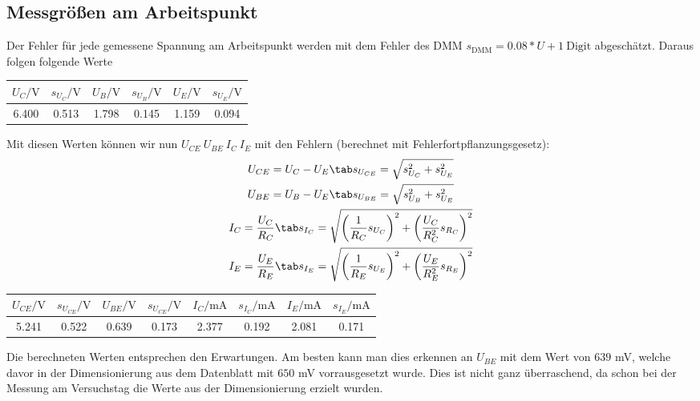 \subsection{Messgrößen am Arbeitspunkt}
Der Fehler für jede gemessene Spannung am Arbeitspunkt werden mit dem Fehler des DMM $s_{\text{DMM}} = 0.08*U + 1~\text{Digit}$ abgeschätzt. Daraus folgen folgende Werte
\begin{center}
    \begin{tabular}{cc|cc|cc}
        $U_C/\text{V}$ & $s_{U_C}/\text{V}$ & $U_B/\text{V}$ & $s_{U_B}/\text{V}$ & $U_E/\text{V}$ & $s_{U_E}/\text{V}$ \\
        \hline
        6.400 & 0.513 & 1.798 & 0.145 & 1.159 & 0.094 \\ 
    \end{tabular}
\end{center}
Mit diesen Werten können wir nun $U_{CE}~U_{BE}~I_C~I_E$ mit den Fehlern (berechnet mit Fehlerfortpflanzungsgesetz):
\begin{gather}
    U_{CE} = U_C - U_E \tab s_{U_{CE}} = \sqrt{s_{U_C}^2+s_{U_E}^2}\\
    U_{BE} = U_B - U_E \tab s_{U_{BE}} = \sqrt{s_{U_B}^2+s_{U_E}^2}\\
    I_C = \frac{U_C}{R_C} \tab s_{I_C} = \sqrt{\left(\frac{1}{R_C}s_{U_C}\right)^2+\left(\frac{U_C}{R_C^2}s_{R_C}\right)^2}\\
    I_E = \frac{U_E}{R_E} \tab s_{I_E} = \sqrt{\left(\frac{1}{R_E}s_{U_E}\right)^2+\left(\frac{U_E}{R_E^2}s_{R_E}\right)^2}
\end{gather}
\begin{center}
    {\color{red}\begin{tabular}{cc|cc|cc|cc}
        $U_{CE}/\text{V}$ & $s_{U_{CE}}/\text{V}$ & $U_{BE}/\text{V}$ & $s_{U_{CE}}/\text{V}$ & $I_C/\text{mA}$ & $s_{I_C}/\text{mA}$ & $I_E/\text{mA}$ & $s_{I_E}/\text{mA}$ \\
        \hline
        5.241 & 0.522 & 0.639 & 0.173 & 2.377 & 0.192 & 2.081 & 0.171 \\ 
    \end{tabular}}
\end{center}
Die berechneten Werten entsprechen den Erwartungen. Am besten kann man dies erkennen an $U_{BE}$ mit dem Wert von $639$ mV, welche davor in der Dimensionierung aus dem Datenblatt mit $650$ mV vorrausgesetzt wurde. Dies ist nicht ganz überraschend, da schon bei der Messung am Versuchstag die Werte aus der Dimensionierung erzielt wurden.

